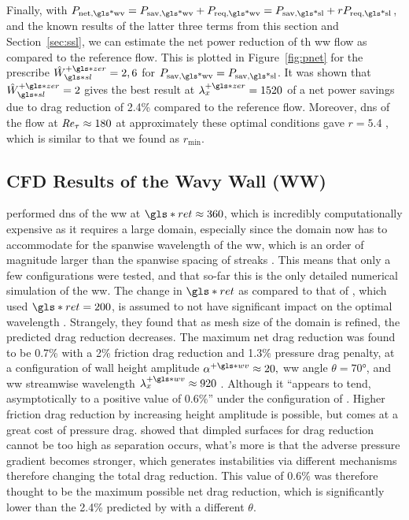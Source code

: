 Finally, with $P_\text{net,\gls*{wv}} = P_\text{sav,\gls*{wv}} +P_\text{req,\gls*{wv}} =P_\text{sav,\gls*{sl}} +rP_\text{req,\gls*{sl}} $, and the known results of the latter three terms from this section and Section~\ref{sec:ssl}, we can estimate the net power reduction of th \gls*{ww} flow as compared to the reference flow. This is plotted in Figure~\ref{fig:pnet} for the prescribe $\hat{W}\pz\ssl=2,6$ for $ P_\text{sav,\gls*{wv}}=P_\text{sav,\gls*{sl}} $. It was shown that $\hat{W}\pz\ssl=2$ gives the best result at $\lambda_x\pz=1520$ of a net power savings due to drag reduction of 2.4\% compared to the reference flow. Moreover, \gls*{dns} of the flow at $\mbox{\textit{Re}}_{\tau}\approx180$ at approximately these optimal conditions gave $r=5.4$ \cite{ghebali2018}, which is similar to that we found as $r_\text{min} $.


\subsection{CFD Results of the Wavy Wall (WW)}\label{sec:cfdww}
\textcite{ghebali2017} performed \gls*{dns} of the \gls*{ww} at $ \gls*{ret}\approx360$, which is incredibly computationally expensive as it requires a large domain, especially since the domain now has to accommodate for the spanwise wavelength of the \gls*{ww}, which is an order of magnitude larger than the spanwise spacing of streaks \cite{chernyshenko2005}. This means that only a few configurations were tested, and that so-far this is the only detailed numerical simulation of the \gls*{ww}. The change in $ \gls*{ret}$ as compared to that of \vqt, which used $ \gls*{ret}=200$, is assumed to not have significant impact on the optimal wavelength \sgc. Strangely, they found that as mesh size of the domain is refined, the predicted drag reduction decreases. The maximum net drag reduction was found to be 0.7\% with a 2\% friction drag reduction and 1.3\% pressure drag penalty, at a configuration of wall height amplitude $\alpha\pw\approx 20,$ \gls*{ww} angle  $\theta=\ang{70}$, and \gls*{ww} streamwise wavelength $\lambda\pw_x\approx920$ \sgc. Although it ``appears to tend, asymptotically to a positive value of 0.6\%'' under the configuration of \sgc. Higher friction drag reduction by increasing height amplitude is possible, but comes at a great cost of pressure drag. \textcite{vannesselrooij2016} showed that dimpled surfaces for drag reduction cannot be too high as separation occurs, what's more is that the adverse pressure gradient becomes stronger, which generates instabilities via different mechanisms therefore changing the total drag reduction. %
This value of 0.6\% was therefore thought to be the maximum possible net drag reduction, which is significantly lower than the 2.4\% predicted by \textcite{chernyshenko2013} with a different $\theta$.

